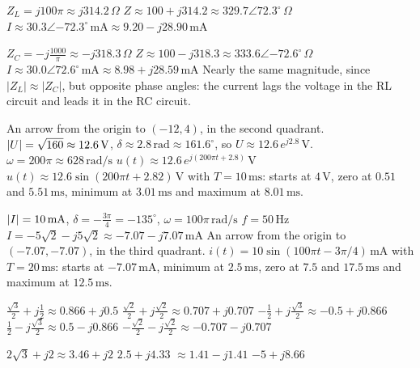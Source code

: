 
\begin{facit}

  $Z_L = j100\pi \approx j314.2\,\Omega$
 $Z \approx 100 + j314.2 \approx 329.7\angle 72.3^{\circ}\,\Omega$
 $I \approx 30.3\angle{-72.3^{\circ}}\,\text{mA} \approx 9.20 - j28.90\,\text{mA}$

  $Z_C = -j\frac{1000}{\pi} \approx -j318.3\,\Omega$
 $Z \approx 100 - j318.3 \approx 333.6\angle{-72.6^{\circ}}\,\Omega$
 $I \approx 30.0\angle 72.6^{\circ}\,\text{mA} \approx 8.98 + j28.59\,\text{mA}$
 Nearly the same magnitude, since $|Z_L| \approx |Z_C|$, but opposite phase angles: the
current lags the voltage in the RL circuit and leads it in the RC circuit.

  An arrow from the origin to $(-12, 4)$, in the second quadrant.
 $\lvert U\rvert = \sqrt{160} \approx 12.6\,\text{V}$, $\delta \approx 2.8\,\text{rad} \approx
161.6^{\circ}$, so $U \approx 12.6\,e^{j2.8}\,\text{V}$.
 $\omega = 200\pi \approx 628\,\text{rad/s}$
 $u(t) \approx 12.6\,e^{j(200\pi t + 2.8)}\,\text{V}$
 $u(t) \approx 12.6\sin(200\pi t + 2.82)\,\text{V}$ with $T = 10\,\text{ms}$: starts at $4\,\text{V}$,
zero at $0.51$ and $5.51\,\text{ms}$, minimum at $3.01\,\text{ms}$ and maximum at $8.01\,\text{ms}$.

  $\lvert I\rvert = 10\,\text{mA}$, $\delta = -\frac{3\pi}{4} = -135^{\circ}$,
$\omega = 100\pi\,\text{rad/s}$
 $f = 50\,\text{Hz}$
 $I = -5\sqrt{2} - j5\sqrt{2} \approx -7.07 - j7.07\,\text{mA}$
 An arrow from the origin to $(-7.07, -7.07)$, in the third quadrant.
 $i(t) = 10\sin(100\pi t - 3\pi/4)\,\text{mA}$ with $T = 20\,\text{ms}$: starts at
$-7.07\,\text{mA}$, minimum at $2.5\,\text{ms}$, zero at $7.5$ and $17.5\,\text{ms}$ and maximum at
$12.5\,\text{ms}$.

  $\frac{\sqrt{3}}{2} + j\frac{1}{2} \approx 0.866 + j0.5$
 $\frac{\sqrt{2}}{2} + j\frac{\sqrt{2}}{2} \approx 0.707 + j0.707$
 $-\frac{1}{2} + j\frac{\sqrt{3}}{2} \approx -0.5 + j0.866$
 $\frac{1}{2} - j\frac{\sqrt{3}}{2} \approx 0.5 - j0.866$
 $-\frac{\sqrt{2}}{2} - j\frac{\sqrt{2}}{2} \approx -0.707 - j0.707$

  $2\sqrt{3} + j2 \approx 3.46 + j2$  $2.5 + j4.33$  $\approx 1.41 - j1.41$
 $-5 + j8.66$


\end{facit}
